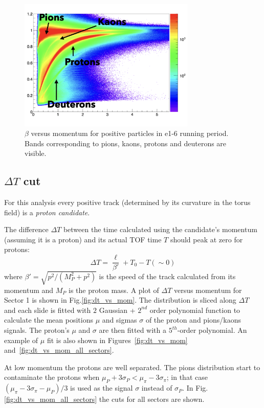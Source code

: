 \begin{figure}[h]
    \centering
    \includegraphics[width=0.75\textwidth ]{img/beta_vs_mom}
    \caption{ $\beta$ versus momentum for positive particles in e1-6 running period. Bands
    corresponding to pions, kaons, protons and deuterons are visible.}
    \label{fig:beta_vs_mom}
\end{figure}

\subsection{$\Delta T$ cut}
\label{sec:clas_timing_cut}

For this analysis every positive track (determined by its curvature in the torus field)
is a \textit{proton candidate}.

The difference $\Delta T$ between the time calculated using
the candidate's momentum (assuming it is a proton) and its actual TOF time $T$
should peak at zero for protons:
\begin{equation}
    \label{eq:protondt}
    \Delta T = \frac{\ell}{\beta'} + T_{0} - T (\sim0 )
\end{equation}
where $\beta' = \sqrt{ p^2 /( M_P^2 + p^2 ) }$ is the speed of the track calculated from its
momentum and $M_P$ is the proton mass.
A plot of $\Delta T$ versus momentum for Sector 1 is shown in
Fig.\ref{fig:dt_vs_mom}.
The distribution is sliced along $\Delta T$ and each slide is fitted
with $2$ Gaussian + $2^{nd}$ order polynomial function to calculate the mean
positions $\mu$ and sigmas $\sigma$ of the proton and pions/kaons signals.
The proton's $\mu$ and $\sigma$ are then fitted with a $5^{th}$-order polynomial.
An example of $\mu$ fit is also shown in
Figures~\ref{fig:dt_vs_mom} and~\ref{fig:dt_vs_mom_all_sectors}.

At low momentum the protons are well separated.
The pions distribution  start to contaminate the protons when
$\mu_{P} + 3\sigma_{P} < \mu_{\pi} - 3\sigma_{\pi}$; in that case
$(\mu_{\pi} - 3\sigma_{\pi} - \mu_{P})/3$ is used as the signal $\sigma$ instead of $\sigma_{P}$.
In Fig.\ref{fig:dt_vs_mom_all_sectors} the cuts for all sectors are shown.

